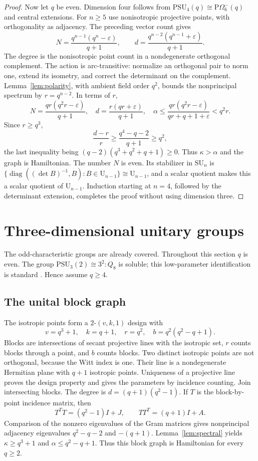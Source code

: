 \documentclass[11pt]{article}
\theoremstyle{definition}
\newcommand{\SU}{\mathrm{SU}}
\newcommand{\PSU}{\mathrm{PSU}}
\newcommand{\U}{\mathrm U}
\newcommand{\diag}{\operatorname{diag}}
\begin{document}
\begin{proof}
Now let $q$ be even. Dimension four follows from $\PSU_4(q)\cong\mathrm P\Omega_6^-(q)$ and central extensions. For $n\ge5$ use nonisotropic projective points, with orthogonality as adjacency. The preceding vector count gives
\[
N=\frac{q^{n-1}(q^n-\varepsilon)}{q+1},\qquad
d=\frac{q^{n-2}(q^{n-1}+\varepsilon)}{q+1}.
\]
The degree is the nonisotropic point count in a nondegenerate orthogonal complement. The action is arc-transitive: normalize an orthogonal pair to norm one, extend its isometry, and correct the determinant on the complement. Lemma~\ref{lem:polarity}, with ambient field order $q^2$, bounds the nonprincipal spectrum by $r=q^{n-2}$. In terms of $r$,
\[
N=\frac{qr(q^2r-\varepsilon)}{q+1},\quad
d=\frac{r(qr+\varepsilon)}{q+1},\quad
\alpha\le\frac{qr(q^2r-\varepsilon)}{qr+q+1+\varepsilon}<q^2r.
\]
Since $r\ge q^3$,
\[
\frac{d-r}{r}\ge\frac{q^4-q-2}{q+1}\ge q^2,
\]
the last inequality being $(q-2)(q^3+q^2+q+1)\ge0$. Thus $\kappa>\alpha$ and the graph is Hamiltonian. The number $N$ is even. Its stabilizer in $\SU_n$ is $\{\diag((\det B)^{-1},B):B\in\U_{n-1}\}\cong\U_{n-1}$, and a scalar quotient makes this a scalar quotient of $\U_{n-1}$. Induction starting at $n=4$, followed by the determinant extension, completes the proof without using dimension three.
\end{proof}

\section{Three-dimensional unitary groups}\label{sec:unitarythree}
The odd-characteristic groups are already covered. Throughout this section $q$ is even. The group $\PSU_3(2)\cong3^2:Q_8$ is soluble; this low-parameter identification is standard \cite{Taylor,Atlas}. Hence assume $q\ge4$.

\subsection{The unital block graph}
The isotropic points form a $2$-$(v,k,1)$ design with
\[
v=q^3+1,\quad k=q+1,\quad r=q^2,\quad b=q^2(q^2-q+1).
\]
Blocks are intersections of secant projective lines with the isotropic set, $r$ counts blocks through a point, and $b$ counts blocks. Two distinct isotropic points are not orthogonal, because the Witt index is one. Their line is a nondegenerate Hermitian plane with $q+1$ isotropic points. Uniqueness of a projective line proves the design property and gives the parameters by incidence counting.
Join intersecting blocks. The degree is $d=(q+1)(q^2-1)$. If $T$ is the block-by-point incidence matrix, then
\[
T^TT=(q^2-1)I+J,\qquad TT^T=(q+1)I+A.
\]
Comparison of the nonzero eigenvalues of the Gram matrices gives nonprincipal adjacency eigenvalues $q^2-q-2$ and $-(q+1)$. Lemma~\ref{lem:spectral} yields $\kappa\ge q^3+1$ and $\alpha\le q^2-q+1$. Thus this block graph is Hamiltonian for every $q\ge2$.
\end{document}
